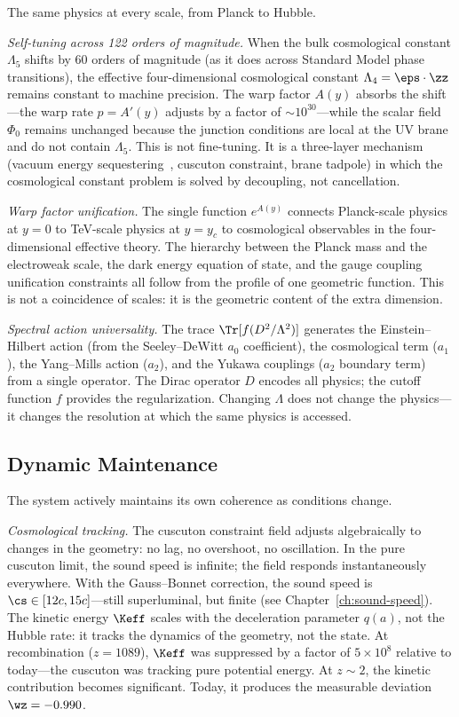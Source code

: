 The same physics at every scale, from Planck to Hubble.

\textit{Self-tuning across 122 orders of magnitude.} When the bulk
cosmological constant $\Lambda_5$ shifts by 60 orders of magnitude
(as it does across Standard Model phase transitions), the effective
four-dimensional cosmological constant
$\Lambda_4 = \eps \cdot \zz$ remains constant to machine precision.
The warp factor $A(y)$ absorbs the shift---the warp rate
$p = A'(y)$ adjusts by a factor of $\sim 10^{30}$---while the scalar
field $\Phi_0$ remains unchanged because the junction conditions are
local at the UV brane and do not contain $\Lambda_5$. This is not
fine-tuning. It is a three-layer mechanism (vacuum energy
sequestering~\cite{ch1:kaloper14}, cuscuton constraint, brane tadpole)
in which the cosmological constant problem is solved by decoupling,
not cancellation.

\textit{Warp factor unification.} The single function $e^{A(y)}$
connects Planck-scale physics at $y = 0$ to TeV-scale physics at
$y = y_c$ to cosmological observables in the four-dimensional effective
theory. The hierarchy between the Planck mass and the electroweak
scale, the dark energy equation of state, and the gauge coupling
unification constraints all follow from the profile of one geometric
function. This is not a coincidence of scales: it is the geometric
content of the extra dimension.

\textit{Spectral action universality.} The trace
$\Tr[f(D^2/\Lambda^2)]$ generates the Einstein--Hilbert action (from
the Seeley--DeWitt $a_0$ coefficient), the cosmological term ($a_1$),
the Yang--Mills action ($a_2$), and the Yukawa couplings ($a_2$
boundary term) from a single operator. The Dirac operator $D$ encodes
all physics; the cutoff function $f$ provides the regularization.
Changing $\Lambda$ does not change the physics---it changes the
resolution at which the same physics is accessed.

\subsection{Dynamic Maintenance}
\label{sec:0-dynamic}

The system actively maintains its own coherence as conditions change.

\textit{Cosmological tracking.} The cuscuton constraint field adjusts
algebraically to changes in the geometry: no lag, no overshoot, no
oscillation. In the pure cuscuton limit, the sound speed is infinite;
the field responds instantaneously everywhere. With the Gauss--Bonnet
correction, the sound speed is $\cs \in [12c, 15c]$---still
superluminal, but finite (see Chapter~\ref{ch:sound-speed}). The
kinetic energy $\Keff$ scales with the deceleration parameter $q(a)$,
not the Hubble rate: it tracks the dynamics of the geometry, not the
state. At recombination ($z = 1089$), $\Keff$ was suppressed by a
factor of $5 \times 10^8$ relative to today---the cuscuton was tracking
pure potential energy. At $z \sim 2$, the kinetic contribution becomes
significant. Today, it produces the measurable deviation
$\wz = -0.990$.

